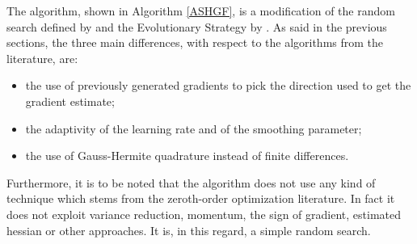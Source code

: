 The algorithm, shown in Algorithm \ref{ASHGF}, is a modification of the random search defined by \cite{nesterov2017random} and the Evolutionary Strategy by \cite{Salimans2017}. As said in the previous sections, the three main differences, with respect to the algorithms from the literature, are:
\begin{itemize}
    \item the use of previously generated gradients to pick the direction used to get the gradient estimate;
    \item the adaptivity of the learning rate and of the smoothing parameter;
    \item the use of Gauss-Hermite quadrature instead of finite differences.
\end{itemize}

Furthermore, it is to be noted that the algorithm does not use any kind of technique which stems from the zeroth-order optimization literature. In fact it does not exploit variance reduction, momentum, the sign of gradient, estimated hessian or other approaches. It is, in this regard, a simple random search.

